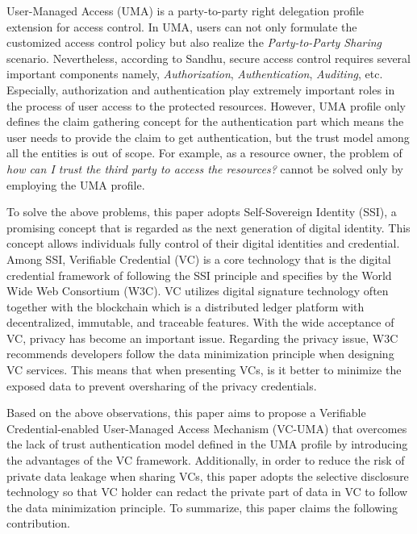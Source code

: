 \documentclass[conference]{IEEEtran}
\begin{document}
\begin{sloppypar}
User-Managed Access (UMA)\cite{UMA} is a party-to-party right delegation profile extension for access control. In UMA, users can not only formulate the customized access control policy\cite{UMA_paper1} but also realize the \textit{Party-to-Party Sharing} scenario. Nevertheless, according to Sandhu\cite{AccessControl_principle}, secure access control requires several important components namely, \textit{Authorization}, \textit{Authentication},  \textit{Auditing}, etc. Especially, authorization and authentication play extremely important roles in the process of user access to the protected resources.
However, UMA profile only defines the claim gathering concept for the authentication part which means the user needs to provide the claim to get authentication, but the trust model among all the entities is out of scope. For example, as a resource owner, the problem of \textit{how can I trust the third party to access the resources?} cannot be solved only by employing the UMA profile. 


To solve the above problems, this paper adopts Self-Sovereign Identity (SSI), a promising concept that is regarded as the next generation of digital identity\cite{Path_to_Self_Sovereign}. This concept allows individuals fully control of their digital identities and credential. Among SSI, Verifiable Credential (VC)\cite{VC_model} is a  core technology that is the digital credential framework of following the SSI principle and specifies by the World Wide Web Consortium (W3C). VC utilizes digital signature technology often together with the blockchain which is a distributed ledger platform with decentralized, immutable, and traceable features. With the wide acceptance of VC, privacy has become an important issue. Regarding the privacy issue, W3C recommends developers follow the data minimization principle\cite{VC_Implementation_Guidelines} when designing VC services. This means that when presenting VCs, is it better to minimize the exposed data to prevent oversharing of the privacy credentials. 

Based on the above observations, this paper aims to propose a Verifiable Credential-enabled User-Managed Access Mechanism 
(VC-UMA) that overcomes the lack of trust authentication model defined in the UMA profile by introducing the advantages of the VC framework. Additionally, in order to reduce the risk of private data leakage when sharing VCs, this paper adopts the selective disclosure technology so that VC holder can redact the private part of data in VC to follow the data minimization principle.
To summarize, this paper claims the following contribution.


\end{sloppypar}
\end{document}
